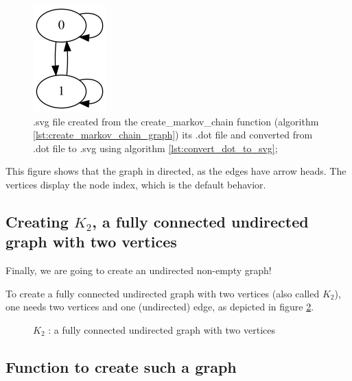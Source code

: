 \begin{figure}[!htbp]
  \includegraphics[]{create_markov_chain.png}
  \caption{
    .svg file created from the create\_markov\_chain function 
    (algorithm \ref{lst:create_markov_chain_graph}) 
    its .dot file and converted from .dot file to .svg using algorithm 
    \ref{lst:convert_dot_to_svg};
  }
  \label{fig:create_markov_chain.svg}
\end{figure}

This figure shows that the graph in directed, as the edges have arrow heads.
The vertices display the node index, which is the default behavior.

\subsection{Creating $K_{2}$, a fully connected undirected graph with two vertices}
\label{subsec:create_k2_graph}

Finally, we are going to create an undirected non-empty graph!

To create a fully connected undirected graph with two vertices (also called
$K_{2}$), 
one needs two vertices and one (undirected) edge, 
as depicted in figure \ref{fig:k2_graph}.


\begin{figure}
  \caption{$K_{2}$ : a fully connected undirected graph with two vertices}
  \label{fig:k2_graph}
\end{figure}

\subsection{Function to create such a graph}

